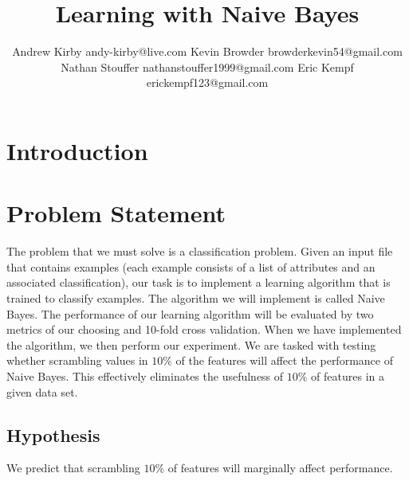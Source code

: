 \documentclass[twoside,11pt]{article}
\begin{document}
\title{Learning with Naive Bayes}

\author{\name Andrew Kirby \email andy-kirby@live.com \AND
		\name Kevin Browder \email browderkevin54@gmail.com \AND
		\name Nathan Stouffer \email nathanstouffer1999@gmail.com \AND
		\name Eric Kempf \email erickempf123@gmail.com }


	
\maketitle

\begin{abstract}
	
\end{abstract}

\begin{keywords}
\end{keywords}

\section{Introduction}

\section{Problem Statement}

The problem that we must solve is a classification problem. Given an input file that contains examples (each example consists of a list of attributes and an associated classification), our task is to implement a learning algorithm that is trained to classify examples. The algorithm we will implement is called Naive Bayes. The performance of our learning algorithm will be evaluated by two metrics of our choosing and 10-fold cross validation.
When we have implemented the algorithm, we then perform our experiment. We are tasked with testing whether scrambling values in $10\%$ of the features will affect the performance of Naive Bayes. This effectively eliminates the usefulness of $10\%$ of features in a given data set.

\subsection{Hypothesis}

We predict that scrambling $10\%$ of features will marginally affect performance.
\end{document}
